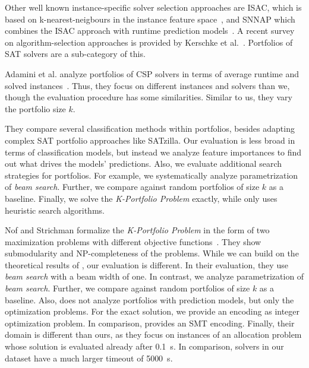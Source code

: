 \documentclass[conference]{IEEEtran}
\begin{document}
Other well known instance-specific solver selection approaches are ISAC, which is based on k-nearest-neigbours in the instance feature space~\cite{Kadioglu:2010:ISAC}, and SNNAP which combines the ISAC approach with runtime prediction models~\cite{Collautti:2013:SNNAP}. 
A recent survey on algorithm-selection approaches is provided by Kerschke et al.~\cite{kerschke2019automated}.
Portfolios of SAT solvers are a sub-category of this. 

Adamini et al. analyze portfolios of CSP solvers in terms of average runtime and solved instances~\cite{amadini2014empirical, amadini2016extensive}. 
Thus, they focus on different instances and solvers than we, though the evaluation procedure has some similarities.
Similar to us, they vary the portfolio size $k$.

They compare several classification methods within portfolios, besides adapting complex SAT portfolio approaches like SATzilla.
Our evaluation is less broad in terms of classification models, but instead we analyze feature importances to find out what drives the models' predictions.
Also, we evaluate additional search strategies for portfolios.
For example, we systematically analyze parametrization of \emph{beam search}.
Further, we compare against random portfolios of size $k$ as a baseline.
Finally, we solve the \emph{K-Portfolio Problem} exactly, while \cite{amadini2014empirical} only uses heuristic search algorithms.

Nof and Strichman formalize the \emph{K-Portfolio Problem} in the form of two maximization problems with different objective functions~\cite{nof2020real}.
They show submodularity and NP-completeness of the problems.
While we can build on the theoretical results of \cite{nof2020real}, our evaluation is different.
In their evaluation, they use \emph{beam search} with a beam width of one.
In contrast, we analyze parametrization of \emph{beam search}.
Further, we compare against random portfolios of size $k$ as a baseline.
Also, \cite{nof2020real} does not analyze portfolios with prediction models, but only the optimization problems.
For the exact solution, we provide an encoding as integer optimization problem.
In comparison, \cite{nof2020real} provides an SMT encoding.
Finally, their domain is different than ours, as they focus on instances of an allocation problem whose solution is evaluated already after 0.1~s.
In comparison, solvers in our dataset have a much larger timeout of 5000~s.
\end{document}

